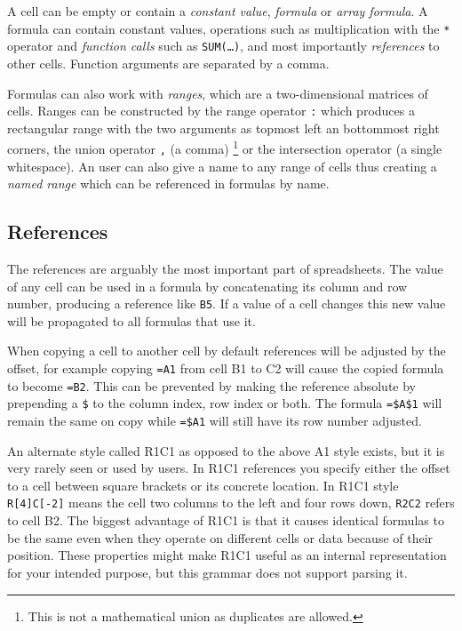 \documentclass[conference]{IEEEtran}
\begin{document}
A cell can be empty or contain a \emph{constant value}, \emph{formula} or \emph{array formula}.
A formula can contain constant values, operations such as multiplication with the \texttt{*} operator and \emph{function calls} such as \texttt{SUM(\ldots)}, and most importantly \emph{references} to other cells.
Function arguments are separated by a comma.

Formulas can also work with \emph{ranges}, which are a two-dimensional matrices of cells.
Ranges can be constructed by the range operator \texttt{:} which produces a rectangular range with the two arguments as topmost left an bottommost right corners, the union operator \texttt{,} (a comma) \footnote{This is not a mathematical union as duplicates are allowed.} or the intersection operator \texttt{} (a single whitespace). 
An user can also give a name to any range of cells thus creating a \emph{named range} which can be referenced in formulas by name.

\subsection{References}
The references are arguably the most important part of spreadsheets.
The value of any cell can be used in a formula by concatenating its column and row number, producing a reference like \texttt{B5}.
If a value of a cell changes this new value will be propagated to all formulas that use it.

When copying a cell to another cell by default references will be adjusted by the offset, for example copying \texttt{=A1} from cell B1 to C2 will cause the copied formula to become \texttt{=B2}.
This can be prevented by making the reference absolute by prepending a \texttt{\$} to the column index, row index or both.
The formula \texttt{=\$A\$1} will remain the same on copy while \texttt{=\$A1} will still have its row number adjusted.

An alternate style called R1C1 as opposed to the above A1 style exists, but it is very rarely seen or used by users.
In R1C1 references you specify either the offset to a cell between square brackets or its concrete location.
In R1C1 style \texttt{R[4]C[-2]} means the cell two columns to the left and four rows down, \texttt{R2C2} refers to cell B2.
The biggest advantage of R1C1 is that it causes identical formulas to be the same even when they operate on different cells or data because of their position.
These properties might make R1C1 useful as an internal representation for your intended purpose, but this grammar does not support parsing it.
\end{document}
